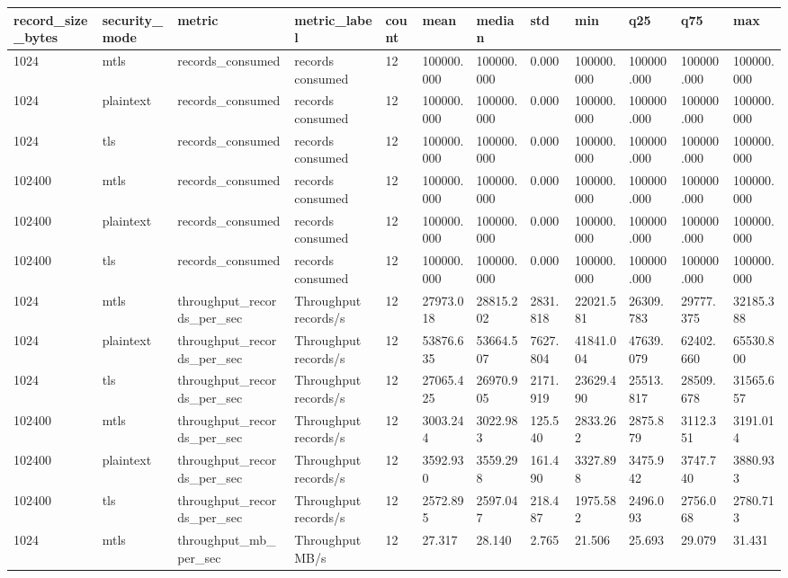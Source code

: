 \begin{longtable}{llllllllllll}
\hline
record\_size\_bytes & security\_mode & metric & metric\_label & count & mean & median & std & min & q25 & q75 & max \\
\hline
1024 & mtls & records\_consumed & records consumed & 12 & 100000.000 & 100000.000 & 0.000 & 100000.000 & 100000.000 & 100000.000 & 100000.000 \\
1024 & plaintext & records\_consumed & records consumed & 12 & 100000.000 & 100000.000 & 0.000 & 100000.000 & 100000.000 & 100000.000 & 100000.000 \\
1024 & tls & records\_consumed & records consumed & 12 & 100000.000 & 100000.000 & 0.000 & 100000.000 & 100000.000 & 100000.000 & 100000.000 \\
102400 & mtls & records\_consumed & records consumed & 12 & 100000.000 & 100000.000 & 0.000 & 100000.000 & 100000.000 & 100000.000 & 100000.000 \\
102400 & plaintext & records\_consumed & records consumed & 12 & 100000.000 & 100000.000 & 0.000 & 100000.000 & 100000.000 & 100000.000 & 100000.000 \\
102400 & tls & records\_consumed & records consumed & 12 & 100000.000 & 100000.000 & 0.000 & 100000.000 & 100000.000 & 100000.000 & 100000.000 \\
1024 & mtls & throughput\_records\_per\_sec & Throughput records/s & 12 & 27973.018 & 28815.202 & 2831.818 & 22021.581 & 26309.783 & 29777.375 & 32185.388 \\
1024 & plaintext & throughput\_records\_per\_sec & Throughput records/s & 12 & 53876.635 & 53664.507 & 7627.804 & 41841.004 & 47639.079 & 62402.660 & 65530.800 \\
1024 & tls & throughput\_records\_per\_sec & Throughput records/s & 12 & 27065.425 & 26970.905 & 2171.919 & 23629.490 & 25513.817 & 28509.678 & 31565.657 \\
102400 & mtls & throughput\_records\_per\_sec & Throughput records/s & 12 & 3003.244 & 3022.983 & 125.540 & 2833.262 & 2875.879 & 3112.351 & 3191.014 \\
102400 & plaintext & throughput\_records\_per\_sec & Throughput records/s & 12 & 3592.930 & 3559.298 & 161.490 & 3327.898 & 3475.942 & 3747.740 & 3880.933 \\
102400 & tls & throughput\_records\_per\_sec & Throughput records/s & 12 & 2572.895 & 2597.047 & 218.487 & 1975.582 & 2496.093 & 2756.068 & 2780.713 \\
1024 & mtls & throughput\_mb\_per\_sec & Throughput MB/s & 12 & 27.317 & 28.140 & 2.765 & 21.506 & 25.693 & 29.079 & 31.431 \\

\end{longtable}
